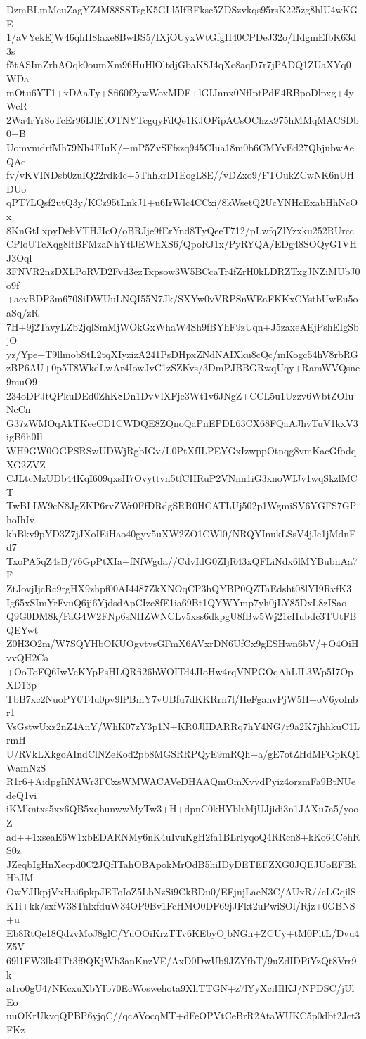 DzmBLmMeuZagYZ4M88SSTsgK5GLl5IfBFksc5ZDSzvkqs95rsK225zg8hlU4wKGE
1/aVYekEjW46qhH8laxe8BwBS5/IXjOUyxWtGfgH40CPDeJ32o/HdgmEfbK63d3s
f5tASImZrhAOqk0oumXm96HuHlOltdjGbaK8J4qXc8aqD7r7jPADQ1ZUaXYq0WDa
mOtu6YT1+xDAaTy+Sfi60f2ywWoxMDF+lGIJnnx0NfIptPdE4RBpoDlpxg+4yWcR
2Wa4rYr8oTcEr96IJlEtOTNYTcgqyFdQe1KJOFipACsOChzx975hMMqMACSDb0+B
UomvmdrfMh79Nh4FIuK/+mP5ZvSFfszq945CIua18m0b6CMYvEd27QbjubwAeQAc
fv/vKVINDsb0zuIQ22rdk4c+5ThhkrD1EogL8E//vDZxo9/FTOukZCwNK6nUHDUo
qPT7LQsf2utQ3y/KCz95tLnkJ1+u6IrWlc4CCxi/8kWsetQ2UcYNHcExabHhNcOx
8KnGtLxpyDebVTHJIcO/oBRJje9fErYnd8TyQeeT712/pLwfqZlYzxku252RUrcc
CPloUTcXqg8ltBFMzaNhYtlJEWhXS6/QpoRJ1x/PyRYQA/EDg48SOQyG1VHJ3Oql
3FNVR2nzDXLPoRVD2Fvd3ezTxpsow3W5BCcaTr4fZrH0kLDRZTxgJNZiMUbJ0o9f
+aevBDP3m670SiDWUuLNQI55N7Jk/SXYw0vVRPSnWEaFKKxCYstbUwEu5oaSq/zR
7H+9j2TavyLZb2jqlSmMjWOkGxWhaW4Sh9fBYhF9zUqn+J5zaxeAEjPshEIgSbjO
yz/Ype+T9llmobStL2tqXIyzizA241PsDHpxZNdNAIXku8cQc/mKogc54hV8rbRG
zBP6AU+0p5T8WkdLwAr4IowJvC1zSZKvs/3DmPJBBGRwqUqy+RamWVQsne9muO9+
234oDPJtQPkuDEd0ZhK8Dn1DvVlXFje3Wt1v6JNgZ+CCL5u1Uzzv6WbtZOIuNcCn
G37zWMOqAkTKeeCD1CWDQE8ZQnoQaPnEPDL63CX68FQaAJhvTuV1kxV3igB6h0Il
WH9GW0OGPSRSwUDWjRgbIGv/L0PtXfILPEYGxIzwppOtnqg8vmKacGfbdqXG2ZVZ
CJLtcMzUDb44KqI609qxsH7Ovyttvn5tfCHRuP2VNnn1iG3xnoWIJv1wqSkzlMCT
TwBLLW9cN8JgZKP6rvZWr0FfDRdgSRR0HCATLUj502p1WgmiSV6YGFS7GPhoIhIv
khBkv9pYD3Z7jJXoIEiHao40gyv5uXW2ZO1CWl0/NRQYInukLSsV4jJe1jMdnEd7
TxoPA5qZ4sB/76GpPtXIa+fNfWgda//CdvIdG0ZIjR43xQFLiNdx6lMYBubnAa7F
ZtJovjIjcRc9rgHX9zhpf00AI4487ZkXNOqCP3hQYBP0QZTaEdsht08lYI9RvfK3
Ig65xSImYrFvuQ6jj6YjdsdApCIze8fE1ia69Bt1QYWYmp7yh0jLY85DxL8zISao
Q9G0DM8k/FaG4W2FNp6sNHZWNCLv5xss6dkpgU8fBw5Wj21cHubdc3TUtFBQEYwt
Z0H3O2m/W7SQYHbOKUOgvtvsGFmX6AVxrDN6UfCx9gESHwn6bV/+O4OiHvvQH2Ca
+OoToFQ6IwVeKYpPsHLQRfi26hWOITd4JIoHw4rqVNPGOqAhLIL3Wp5I7OpXD13p
TbB7xc2NuoPY0T4u0pv9lPBmY7vUBfu7dKKRrn7l/HeFganvPjW5H+oV6yoInbr1
VsGstwUxz2nZ4AnY/WhK07zY3p1N+KR0JlIDARRq7hY4NG/r9a2K7jhhkuC1LrmH
U/RVkLXkgoAIndClNZeKod2pb8MGSRRPQyE9mRQh+a/gE7otZHdMFGpKQ1WamNzS
R1r6+AidpgIiNAWr3FCxsWMWACAVeDHAAQmOmXvvdPyiz4orzmFa9BtNUedeQ1vi
iKMkntxs5xx6QB5xqhunwwMyTw3+H+dpnC0kHYblrMjUJjidi3n1JAXu7a5/yooZ
ad++1xseaE6W1xbEDARNMy6nK4uIvuKgH2fa1BLrIyqoQ4RRcn8+kKo64CehRS0z
JZeqbIgHnXecpd0C2JQfITahOBApokMrOdB5hiIDyDETEFZXG0JQEJUoEFBhHbJM
OwYJIkpjVxHai6pkpJEToIoZ5LbNzSi9CkBDu0/EFjnjLaeN3C/AUxR//eLGqilS
K1i+kk/sxfW38TnlxfduW34OP9Bv1FcHMO0DF69jJFkt2uPwiSOl/Rjz+0GBNS+u
Eb8RtQe18QdzvMoJ8glC/YuOOiKrzTTv6KEbyOjbNGn+ZCUy+tM0PltL/Dvu4Z5V
69l1EW3lk4ITt3f9QKjWb3anKnzVE/AxD0DwUb9JZYfbT/9uZdIDPiYzQt8Vrr9k
a1ro0gU4/NKcxuXbYIb70EcWoswehota9XhTTGN+z7lYyXciHlKJ/NPDSC/jUlEo
uuOKrUkvqQPBP6yjqC//qcAVocqMT+dFeOPVtCeBrR2AtaWUKC5p0dbt2Jct3FKz
